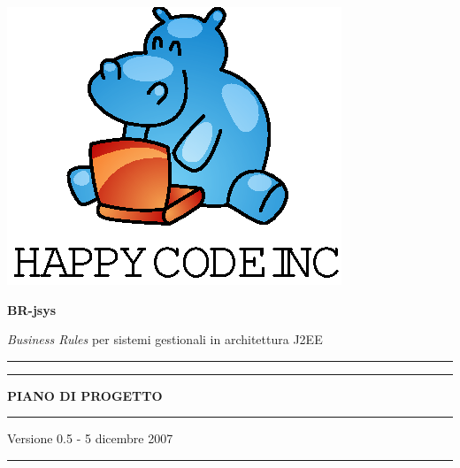 \documentclass[11pt,titlepage,a4paper]{report}
\begin{document}
\begin{titlepage}
\begin{center}
\vspace*{0.5in}
\includegraphics{logo.eps}
\vspace*{0.2in}

{\Large \textbf{BR-jsys}}

{\Large \emph{Business Rules} per sistemi gestionali in architettura J2EE } 
\vspace{1.3in}
\par\rule{10cm}{.4pt} \par
\par\rule{12cm}{1pt} \par
\vspace*{0.5in}
\LARGE \textbf {PIANO DI PROGETTO} %
\vspace*{0.5in}
\par\rule{12cm}{1pt} \par
{\large Versione 0.5 - {5 dicembre 2007}}
\par\rule{10cm}{.4pt} \par

\end{center}
\end{titlepage}
\vspace*{0.5in}
\end{document}
